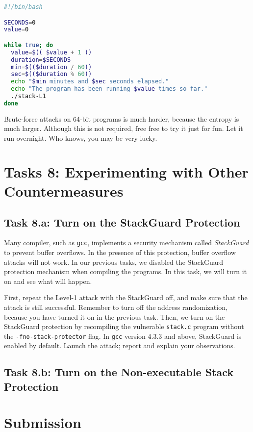 \begin{lstlisting}[language=bash]
#!/bin/bash

SECONDS=0
value=0

while true; do
  value=$(( $value + 1 ))
  duration=$SECONDS
  min=$(($duration / 60))
  sec=$(($duration % 60))
  echo "$min minutes and $sec seconds elapsed."
  echo "The program has been running $value times so far."
  ./stack-L1
done
\end{lstlisting}


Brute-force attacks on 64-bit programs is much harder, because the entropy
is much larger. Although this is not required, free free to try it just for fun. 
Let it run overnight. Who knows, you may be very lucky. 


\section{Tasks 8: Experimenting with Other Countermeasures}


\subsection{Task 8.a: Turn on the StackGuard Protection}

Many compiler, such as \texttt{gcc}, implements a security mechanism called
\textit{StackGuard} to prevent buffer overflows. In the presence of this
protection, buffer overflow attacks will not work.
In our previous tasks, we disabled the StackGuard protection mechanism
when compiling the programs. In this task, we will turn it on and
see what will happen.

First, repeat the Level-1 attack with the StackGuard off, and make sure that the
attack is still successful. Remember to turn off the address randomization, because
you have turned it on in the previous task.
Then, we turn on the StackGuard protection by
recompiling the vulnerable \texttt{stack.c} program without the
\texttt{-fno-stack-protector} flag.
In \texttt{gcc} version 4.3.3 and above, StackGuard is enabled by
default. Launch the attack; report and explain your observations.



\subsection{Task 8.b: Turn on the Non-executable Stack Protection}





\section{Submission}




